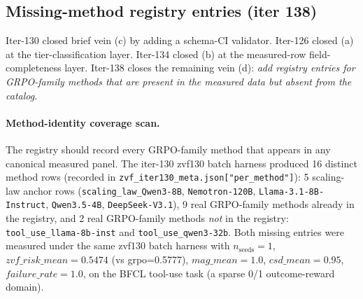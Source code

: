 %
%

\subsection{Missing-method registry entries (iter 138)}
\label{sec:p6-iter138-missing-method}

Iter-130 closed brief vein (c) by adding a schema-CI validator.
Iter-126 closed (a) at the tier-classification layer. Iter-134 closed
(b) at the measured-row field-completeness layer. Iter-138 closes the
remaining vein (d): \emph{add registry entries for GRPO-family methods
that are present in the measured data but absent from the catalog}.

\paragraph{Method-identity coverage scan.}
The registry should record every GRPO-family method that appears in
any canonical measured panel. The iter-130 zvf130 batch harness
produced 16 distinct method rows (recorded in
\texttt{zvf\_iter130\_meta.json["per\_method"]}): 5
scaling-law anchor rows (\texttt{scaling\_law\_Qwen3-8B},
\texttt{Nemotron-120B}, \texttt{Llama-3.1-8B-Instruct},
\texttt{Qwen3.5-4B}, \texttt{DeepSeek-V3.1}), 9 real GRPO-family
methods already in the registry, and 2 real GRPO-family methods
\emph{not} in the registry:
\texttt{tool\_use\_llama-8b-inst} and \texttt{tool\_use\_qwen3-32b}.
Both missing entries were measured under the same zvf130 batch harness
with $n_{\text{seeds}}=1$, $\mathit{zvf\_risk\_mean} = 0.5474$ (vs
grpo=0.5777), $\mathit{mag\_mean}=1.0$, $\mathit{csd\_mean}=0.95$,
$\mathit{failure\_rate}=1.0$, on the BFCL tool-use task (a sparse 0/1
outcome-reward domain).

